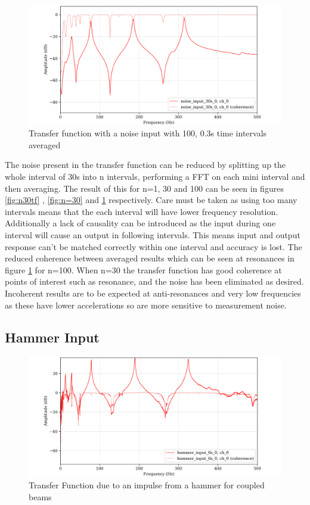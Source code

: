 \documentclass[twoside,onecolumn]{article}
\begin{document}
\begin{figure}[h]
  \centering
    \includegraphics[width=\linewidth]{2-n=100}
  \caption{Transfer function with a noise input with 100, 0.3s time intervals averaged}
  \label{fig:n=100}
\end{figure}

The noise present in the transfer function can be reduced by splitting up the whole interval of 30s into n intervals, performing a FFT on each mini interval and then averaging. The result of this for n=1, 30 and 100 can be seen in figures \ref{fig:n30tf} , \ref{fig:n=30} and \ref{fig:n=100} respectively. Care must be taken as using too many intervals means that the each interval will have lower frequency resolution. Additionally a lack of causality can be introduced as the input during one interval will cause an output in following intervals. This means input and output response can't be matched correctly within one interval and accuracy is lost. The reduced coherence between averaged results which can be seen at resonances in figure \ref{fig:n=100} for n=100. When n=30 the transfer function has good coherence at points of interest such as resonance, and the noise has been eliminated as desired. Incoherent results are to be expected at anti-resonances and very low frequencies as these have lower accelerations so are more sensitive to measurement noise.
\subsection{Hammer Input}
\begin{figure}[!hb]
  \centering
    \includegraphics[width=\linewidth]{3-hammertf}
  \caption{Transfer Function due to an impulse from a hammer  for coupled beams}
  \label{fig:htf}
\end{figure}
\end{document}
